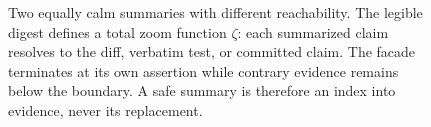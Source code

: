 \begin{figure}[H]
\caption{Two equally calm summaries with different reachability. The legible
digest defines a total zoom function $\zeta$: each summarized claim resolves to
the diff, verbatim test, or committed claim. The facade terminates at its own
assertion while contrary evidence remains below the boundary. A safe summary is
therefore an index into evidence, never its replacement.}
\label{fig:zoom-vs-potemkin}
\end{figure}
